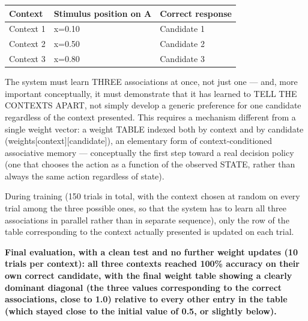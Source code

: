 \documentclass[
  english,
]{article}
\newcounter{none} %
\begin{document}
{\def\LTcaptype{none} %
\begin{longtable}[]{@{}
  >{\raggedright\arraybackslash}p{}
  >{\raggedright\arraybackslash}p{}
  >{\raggedright\arraybackslash}p{}@{}}
\toprule\noalign{}
\begin{minipage}[b]{\linewidth}\raggedright
Context
\end{minipage} & \begin{minipage}[b]{\linewidth}\raggedright
Stimulus position on A
\end{minipage} & \begin{minipage}[b]{\linewidth}\raggedright
Correct response
\end{minipage} \\
\midrule\noalign{}
\endhead
\bottomrule\noalign{}
\endlastfoot
Context 1 & x=0.10 & Candidate 1 \\
Context 2 & x=0.50 & Candidate 2 \\
Context 3 & x=0.80 & Candidate 3 \\
\end{longtable}
}

The system must learn THREE associations at once, not just one --- and, more important conceptually, it must demonstrate that it has learned to TELL THE CONTEXTS APART, not simply develop a generic preference for one candidate regardless of the context presented. This requires a mechanism different from a single weight vector: a weight TABLE indexed both by context and by candidate (weights{[}context{]}{[}candidate{]}), an elementary form of context-conditioned associative memory --- conceptually the first step toward a real decision policy (one that chooses the action as a function of the observed STATE, rather than always the same action regardless of state).

During training (150 trials in total, with the context chosen at random on every trial among the three possible ones, so that the system has to learn all three associations in parallel rather than in separate sequence), only the row of the table corresponding to the context actually presented is updated on each trial.

\textbf{Final evaluation, with a clean test and no further weight updates (10 trials per context): all three contexts reached 100\% accuracy on their own correct candidate, with the final weight table showing a clearly dominant diagonal (the three values corresponding to the correct associations, close to 1.0) relative to every other entry in the table (which stayed close to the initial value of 0.5, or slightly below).}
\end{document}
